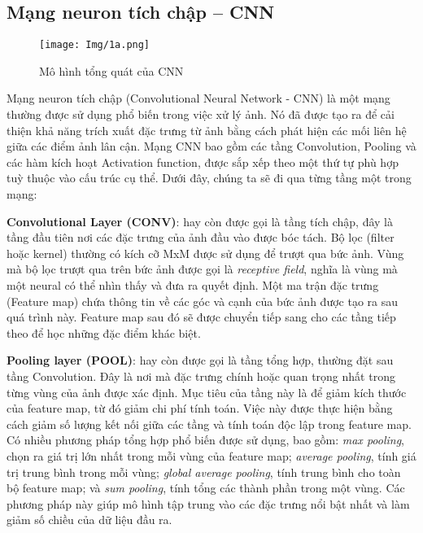 \documentclass[12pt]{report}
\begin{document}
\subsection{Mạng neuron tích chập – CNN}

\vspace{1em}
\begin{figure}[H]
    \centering
    \texttt{[image: Img/1a.png]}
    \caption{Mô hình tổng quát của CNN}
    \label{fig:2.4}
\end{figure}
\vspace{0.5em}

Mạng neuron tích chập (Convolutional Neural Network - CNN) là một mạng thường được sử dụng phổ biến trong việc xử lý ảnh. Nó đã được tạo ra để cải thiện khả năng trích xuất đặc trưng từ ảnh bằng cách phát hiện các mối liên hệ giữa các điểm ảnh lân cận. Mạng CNN bao gồm các tầng Convolution, Pooling và các hàm kích hoạt Activation function, được sắp xếp theo một thứ tự phù hợp tuỳ thuộc vào cấu trúc cụ thể. Dưới đây, chúng ta sẽ đi qua từng tầng một trong mạng:

\textbf{Convolutional Layer (CONV)}: hay còn được gọi là tầng tích chập, đây là tầng đầu tiên nơi các đặc trưng của ảnh đầu vào được bóc tách. Bộ lọc (filter hoặc kernel) thường có kích cỡ MxM được sử dụng để trượt qua bức ảnh. Vùng mà bộ lọc trượt qua trên bức ảnh được gọi là \textit{receptive field}, nghĩa là vùng mà một neural có thể nhìn thấy và đưa ra quyết định. Một ma trận đặc trưng (Feature map) chứa thông tin về các góc và cạnh của bức ảnh được tạo ra sau quá trình này. Feature map sau đó sẽ được chuyển tiếp sang cho các tầng tiếp theo để học những đặc điểm khác biệt.

\textbf{Pooling layer (POOL)}: hay còn được gọi là tầng tổng hợp, thường đặt sau tầng Convolution. Đây là nơi mà đặc trưng chính hoặc quan trọng nhất trong từng vùng của ảnh được xác định. Mục tiêu của tầng này là để giảm kích thước của feature map, từ đó giảm chi phí tính toán. Việc này được thực hiện bằng cách giảm số lượng kết nối giữa các tầng và tính toán độc lập trong feature map. Có nhiều phương pháp tổng hợp phổ biến được sử dụng, bao gồm: \textit{max pooling}, chọn ra giá trị lớn nhất trong mỗi vùng của feature map; \textit{average pooling}, tính giá trị trung bình trong mỗi vùng; \textit{global average pooling}, tính trung bình cho toàn bộ feature map; và \textit{sum pooling}, tính tổng các thành phần trong một vùng. Các phương pháp này giúp mô hình tập trung vào các đặc trưng nổi bật nhất và làm giảm số chiều của dữ liệu đầu ra.
\end{document}
